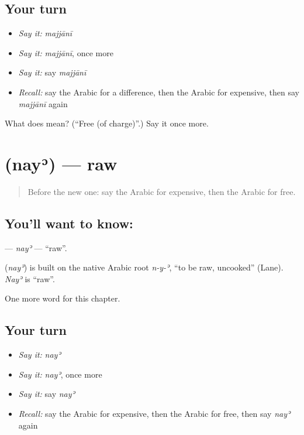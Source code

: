 \subsection*{Your turn}
\begin{itemize}
\raggedright
  \item \emph{Say it:} \emph{majjānī}
  \item \emph{Say it:} \emph{majjānī}, once more
  \item \emph{Say it:} say \emph{majjānī}
  \item \emph{Recall:} say the Arabic for a difference, then the Arabic for expensive, then say \emph{majjānī} again
\end{itemize}

\begin{tcolorbox}[breakable,colback=teal!4,colframe=teal!35!black,title={Before you move on}]
What does  mean? (\textquotedblleft{}Free (of charge)\textquotedblright{}.) Say it once more.
\end{tcolorbox}
\section[\texorpdfstring{\ar{نيء} (nayʾ)}{نيء (nayʾ)}]{ (nayʾ) — raw}

\label{lesson:AR-C177-nay}



\begin{quote}
Before the new one: say the Arabic for expensive, then the Arabic for free.
\end{quote}

\subsection*{You'll want to know: }
\textbf{} — \emph{nayʾ} — \textquotedblleft{}raw\textquotedblright{}.

\begin{cousinweb}
\textbf{} (\emph{nayʾ}) is built on the native Arabic root \emph{n-y-ʾ}, \textquotedblleft{}to be raw, uncooked\textquotedblright{} (Lane). \emph{Nayʾ} is \textquotedblleft{}raw\textquotedblright{}.
\end{cousinweb}

\begin{grammarlens}[title={What you've built}]
One more word for this chapter.
\end{grammarlens}

\subsection*{Your turn}
\begin{itemize}
\raggedright
  \item \emph{Say it:} \emph{nayʾ}
  \item \emph{Say it:} \emph{nayʾ}, once more
  \item \emph{Say it:} say \emph{nayʾ}
  \item \emph{Recall:} say the Arabic for expensive, then the Arabic for free, then say \emph{nayʾ} again
\end{itemize}

